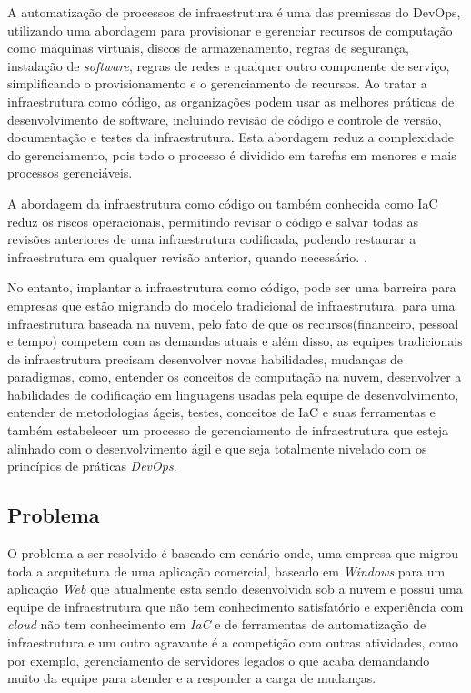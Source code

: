 A automatização de processos de infraestrutura é uma das premissas do DevOps, utilizando uma abordagem para provisionar e gerenciar recursos de computação como máquinas virtuais, discos de armazenamento, regras de segurança, instalação de \textit{software}, regras de redes e qualquer outro componente de serviço, simplificando o provisionamento e o gerenciamento de recursos. Ao tratar a infraestrutura como código, as organizações podem usar as melhores práticas de desenvolvimento de software, incluindo revisão de código e controle de versão, documentação e testes da infraestrutura. Esta abordagem reduz a complexidade do gerenciamento, pois todo o processo é dividido em tarefas em menores e mais processos gerenciáveis.

A abordagem da infraestrutura como código ou também conhecida como IaC reduz os riscos operacionais, permitindo revisar o código e salvar todas as revisões anteriores de uma infraestrutura codificada, podendo restaurar a infraestrutura em qualquer revisão anterior, quando necessário. \cite{Morris:2016:ICM:3006361}.

No entanto, implantar a infraestrutura como código, pode ser uma barreira para empresas que estão migrando do modelo tradicional de infraestrutura, para uma infraestrutura baseada na nuvem, pelo fato de que os recursos(financeiro, pessoal e tempo) competem com as demandas atuais e além disso, as equipes tradicionais de infraestrutura precisam desenvolver novas habilidades, mudanças de paradigmas, como, entender os conceitos de computação na nuvem, desenvolver a habilidades de codificação em linguagens usadas pela equipe de desenvolvimento, entender de metodologias ágeis, testes, conceitos de IaC e suas ferramentas e também estabelecer um processo de gerenciamento de infraestrutura que esteja alinhado com o desenvolvimento ágil e que seja totalmente nivelado com os princípios de práticas \textit{DevOps}. 


\subsection{Problema}

O problema a ser resolvido é baseado em cenário onde, uma empresa que migrou toda a arquitetura de uma aplicação comercial, baseado em \textit{Windows} para um aplicação \textit{Web} que atualmente esta sendo desenvolvida sob a nuvem e possui uma equipe de infraestrutura que não tem conhecimento satisfatório e experiência com \textit{cloud} não tem conhecimento em \textit{IaC} e de ferramentas de automatização de infraestrutura e um outro agravante é a competição com outras atividades, como por exemplo, gerenciamento de servidores legados o que acaba demandando muito da equipe para atender e a responder a carga de mudanças.

